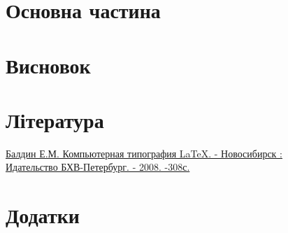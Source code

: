 \documentclass[a4paper]{article}
\begin{document}
\newpage
\section{Основна частина}
\newpage
\section{Висновок}
\newpage
\section{Література}
\begin{thebibliography}{9}
\href{ctex_Baldin.pdf}{Балдин Е.М. Компьютерная типография LaTeX. - Новосибирск : \\Идательство БХВ-Петербург. - 2008. -308с.}
\end{thebibliography}
\newpage
\section{Додатки}
\end{document}
